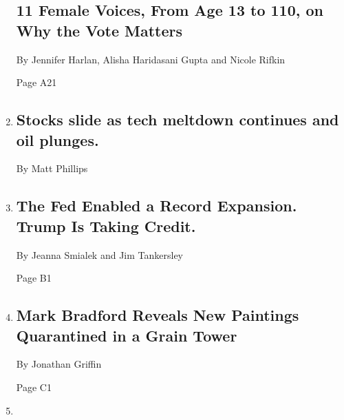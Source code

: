 \begin{enumerate}
  \hypertarget{11-female-voices-from-age-13-to-110-on-why-the-vote-matters}{%
  \subsection{11 Female Voices, From Age 13 to 110, on Why the Vote
  Matters}\label{11-female-voices-from-age-13-to-110-on-why-the-vote-matters}}

  By Jennifer Harlan, Alisha Haridasani Gupta and Nicole Rifkin

  Page A21
\item
  \href{/live/2020/09/08/business/stock-market-today-coronavirus/stocks-slide-as-tech-meltdown-continues-and-oil-plunges}{}

  \hypertarget{stocks-slide-as-tech-meltdown-continues-and-oil-plunges}{%
  \subsection{Stocks slide as tech meltdown continues and oil
  plunges.}\label{stocks-slide-as-tech-meltdown-continues-and-oil-plunges}}

  By Matt Phillips
\item
  \href{/2020/09/08/business/economy/trump-economy-fed.html}{}

  \hypertarget{the-fed-enabled-a-record-expansion-trump-is-taking-credit}{%
  \subsection{The Fed Enabled a Record Expansion. Trump Is Taking
  Credit.}\label{the-fed-enabled-a-record-expansion-trump-is-taking-credit}}

  By Jeanna Smialek and Jim Tankersley

  Page B1
\item
  \href{/2020/09/08/arts/design/mark-bradford-new-paintings-quarantine.html}{}

  \hypertarget{mark-bradford-reveals-new-paintings-quarantined-in-a-grain-tower}{%
  \subsection{Mark Bradford Reveals New Paintings Quarantined in a Grain
  Tower}\label{mark-bradford-reveals-new-paintings-quarantined-in-a-grain-tower}}

  By Jonathan Griffin

  Page C1
\item
  \href{/2020/09/08/arts/music/jazz-clubs-coronavirus.html}{}


\end{enumerate}
